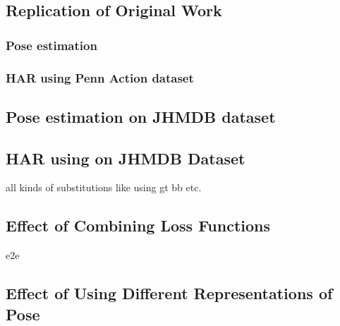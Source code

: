 \subsection{Replication of Original Work}
\label{sec:exp-replication}

\subsubsection{Pose estimation}

\subsubsection{HAR using Penn Action dataset}

\subsection{Pose estimation on JHMDB dataset}

\subsection{HAR using on JHMDB Dataset}
all kinds of substitutions like using gt bb etc.

\subsection{Effect of Combining Loss Functions}
e2e

\subsection{Effect of Using Different Representations of Pose}
\label{sec:different_pose_representation_experiment}

